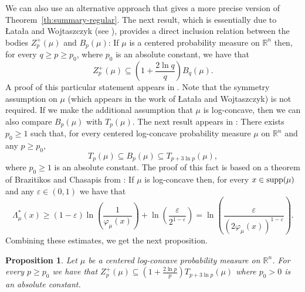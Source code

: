 \documentclass[11pt,leqno]{article}
\newtheorem{proposition}[theorem]{Proposition}
\theoremstyle{definition}
\theoremstyle{remark}
\numberwithin{equation}{section}
\newcommand{\gr}{\geqslant}
\newcommand{\1}{\textbf{1}}
\begin{document}
We can also use an alternative approach that gives a more precise version of Theorem~\ref{th:summary-regular}.
The next result, which is essentially due to \L ata\l a and Wojtaszczyk (see \cite[Proposition~3.2]{Latala-Wojtaszczyk-2008}),
provides a direct inclusion relation between the bodies $Z_p^+(\mu)$ and $B_p(\mu)$:
If $\mu$ is a centered probability measure on $\mathbb{R}^n$ then, for every $q\gr p\gr p_0$, where
$p_0$ is an absolute constant, we have that
\begin{equation}\label{eq:log-concave-2}Z_p^+(\mu) \subseteq \left(1+\frac{2\ln q}{q}\right)B_q(\mu).\end{equation}
A proof of this particular statement appears in \cite[Proposition~2.5]{Giannopoulos-Tziotziou-2025}. Note that the symmetry assumption
on $\mu$ (which appears in the work of \L ata\l a and Wojtaszczyk) is not required.
If we make the additional assumption that $\mu$ is log-concave, then we can also compare $B_p(\mu)$
with $T_p(\mu)$. The next result appears in \cite[Proposition~2.7]{Giannopoulos-Tziotziou-2025}:
There exists $p_0\gr 1$ such that, for every centered log-concave
probability measure $\mu$ on $\mathbb{R}^n$ and any $p\gr p_0$,
\begin{equation}\label{eq:log-concave-3}T_p(\mu)\subseteq B_p(\mu)\subseteq T_{p+3\ln p}(\mu),\end{equation}
where $p_0\gr 1$ is an absolute constant. The proof of this fact is based on a theorem of Brazitikos and Chasapis
from \cite{Brazitikos-Chasapis-2024}: If $\mu$ is log-concave then, for every $x\in {\rm supp}(\mu)$
and any $\varepsilon\in (0,1)$ we have that
\begin{equation}\label{eq:log-concave-4}\Lambda_{\mu}^{\ast}(x)\gr (1-\varepsilon)\ln\left(\frac{1}{\varphi_{\mu}(x)}\right)
+\ln\left(\frac{\varepsilon}{2^{1-\varepsilon}}\right)
=\ln\left(\frac{\varepsilon}{(2\varphi_{\mu}(x))^{1-\varepsilon}}\right).\end{equation}
Combining these estimates, we get the next proposition.

\begin{proposition}\label{prop:summary-log-concave}Let $\mu$ be a centered log-concave probability measure on $\mathbb{R}^n$.
For every $p\gr p_0$ we have that $Z_p^+(\mu)\subseteq \left(1+\frac{2\ln p}{p}\right)T_{p+3\ln p}(\mu)$
where $p_0>0$ is an absolute constant.
\end{proposition}
\end{document}
